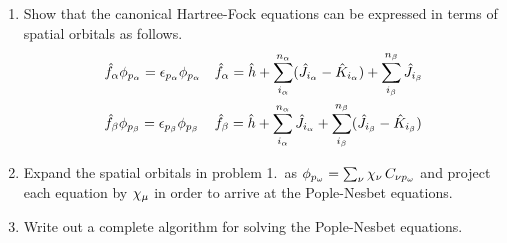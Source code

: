 \documentclass[11pt]{article}
\numberwithin{equation}{section}
\begin{document}
\begin{enumerate}
\item
  Show that the canonical Hartree-Fock equations can be expressed in terms of spatial orbitals as follows.
  \begin{align*}
  &
    \hat{f}_{\alpha } \phi _{p_{\alpha }}
  =
    \epsilon _{p_{\alpha }} \phi _{p_{\alpha }}
  &&
    \hat{f}_{\alpha }
  =
    \hat{h}
  +
    \sum_{i_{\alpha }}^{n_{\alpha }}
    (\hat{J}_{i_{\alpha }} - \hat{K}_{i_{\alpha }})
  +
    \sum_{i_{\beta }}^{n_{\beta }}
    \hat{J}_{i_{\beta }}
  \\
  &
    \hat{f}_{\beta } \phi _{p_{\beta }}
  =
    \epsilon _{p_{\beta }} \phi _{p_{\beta }}
  &&
    \hat{f}_{\beta }
  =
    \hat{h}
  +
    \sum_{i_{\alpha }}^{n_{\alpha }}
    \hat{J}_{i_{\alpha }}
  +
    \sum_{i_{\beta }}^{n_{\beta }}
    (\hat{J}_{i_{\beta }} - \hat{K}_{i_{\beta }})
  \end{align*}

\item
  Expand the spatial orbitals in problem 1.~as
  $
    \f_{p_\w}
  =
    \sum_\nu
    \x_\nu\,
    C_{\nu p_\w}
  $
  and project each equation by $\x_\mu$ in order to arrive at the Pople-Nesbet equations.

\item
  Write out a complete algorithm for solving the Pople-Nesbet equations.
\end{enumerate}
\end{document}
